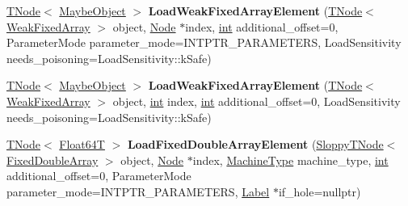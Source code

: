 \begin{DoxyCompactItemize}
\item 
\mbox{\label{classv8_1_1internal_1_1CodeStubAssembler_ad6b37747099f0ab5a369362387e61d41}} 
\mbox{\hyperlink{classv8_1_1internal_1_1compiler_1_1TNode}{T\+Node}}$<$ \mbox{\hyperlink{classv8_1_1internal_1_1MaybeObject}{Maybe\+Object}} $>$ {\bfseries Load\+Weak\+Fixed\+Array\+Element} (\mbox{\hyperlink{classv8_1_1internal_1_1compiler_1_1TNode}{T\+Node}}$<$ \mbox{\hyperlink{classv8_1_1internal_1_1WeakFixedArray}{Weak\+Fixed\+Array}} $>$ object, \mbox{\hyperlink{classv8_1_1internal_1_1compiler_1_1Node}{Node}} $\ast$index, \mbox{\hyperlink{classint}{int}} additional\+\_\+offset=0, Parameter\+Mode parameter\+\_\+mode=I\+N\+T\+P\+T\+R\+\_\+\+P\+A\+R\+A\+M\+E\+T\+E\+RS, Load\+Sensitivity needs\+\_\+poisoning=Load\+Sensitivity\+::k\+Safe)
\item 
\mbox{\label{classv8_1_1internal_1_1CodeStubAssembler_a544a2abee1aeb8b0d43594e8e1dacac9}} 
\mbox{\hyperlink{classv8_1_1internal_1_1compiler_1_1TNode}{T\+Node}}$<$ \mbox{\hyperlink{classv8_1_1internal_1_1MaybeObject}{Maybe\+Object}} $>$ {\bfseries Load\+Weak\+Fixed\+Array\+Element} (\mbox{\hyperlink{classv8_1_1internal_1_1compiler_1_1TNode}{T\+Node}}$<$ \mbox{\hyperlink{classv8_1_1internal_1_1WeakFixedArray}{Weak\+Fixed\+Array}} $>$ object, \mbox{\hyperlink{classint}{int}} index, \mbox{\hyperlink{classint}{int}} additional\+\_\+offset=0, Load\+Sensitivity needs\+\_\+poisoning=Load\+Sensitivity\+::k\+Safe)
\item 
\mbox{\label{classv8_1_1internal_1_1CodeStubAssembler_afe100220f06801ecf06985ff070c4ca1}} 
\mbox{\hyperlink{classv8_1_1internal_1_1compiler_1_1TNode}{T\+Node}}$<$ \mbox{\hyperlink{structv8_1_1internal_1_1Float64T}{Float64T}} $>$ {\bfseries Load\+Fixed\+Double\+Array\+Element} (\mbox{\hyperlink{classv8_1_1internal_1_1compiler_1_1SloppyTNode}{Sloppy\+T\+Node}}$<$ \mbox{\hyperlink{classv8_1_1internal_1_1FixedDoubleArray}{Fixed\+Double\+Array}} $>$ object, \mbox{\hyperlink{classv8_1_1internal_1_1compiler_1_1Node}{Node}} $\ast$index, \mbox{\hyperlink{classv8_1_1internal_1_1MachineType}{Machine\+Type}} machine\+\_\+type, \mbox{\hyperlink{classint}{int}} additional\+\_\+offset=0, Parameter\+Mode parameter\+\_\+mode=I\+N\+T\+P\+T\+R\+\_\+\+P\+A\+R\+A\+M\+E\+T\+E\+RS, \mbox{\hyperlink{classv8_1_1internal_1_1compiler_1_1CodeAssemblerLabel}{Label}} $\ast$if\+\_\+hole=nullptr)

\end{DoxyCompactItemize}
